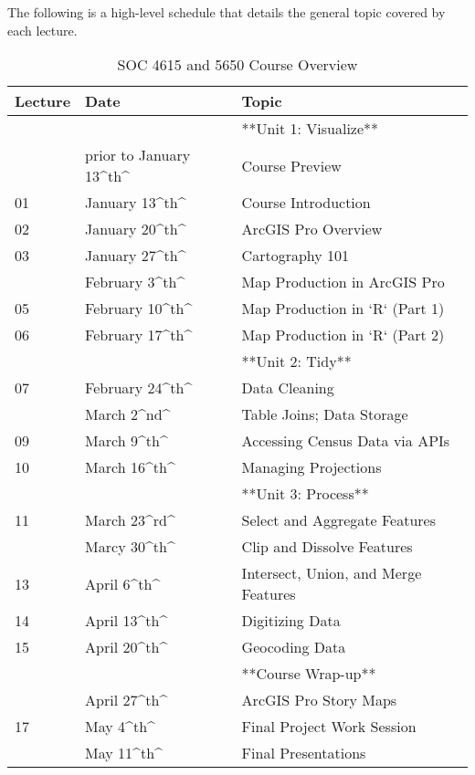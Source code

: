 \documentclass[
]{book}
\begin{document}
The following is a high-level schedule that details the general topic covered by each lecture.

\begin{table}

\caption{\label{tab:unnamed-chunk-1}SOC 4615 and 5650 Course Overview}
\centering
\begin{tabular}[t]{lll}
\toprule
Lecture & Date & Topic\\
\midrule
 &  & **Unit 1: Visualize**\\
 & prior to January 13\textasciicircum{}th\textasciicircum{} & Course Preview\\
01 & January 13\textasciicircum{}th\textasciicircum{} & Course Introduction\\
02 & January 20\textasciicircum{}th\textasciicircum{} & ArcGIS Pro Overview\\
03 & January 27\textasciicircum{}th\textasciicircum{} & Cartography 101\\
\addlinespace
04 & February 3\textasciicircum{}th\textasciicircum{} & Map Production in ArcGIS Pro\\
05 & February 10\textasciicircum{}th\textasciicircum{} & Map Production in `R` (Part 1)\\
06 & February 17\textasciicircum{}th\textasciicircum{} & Map Production in `R` (Part 2)\\
 &  & **Unit 2: Tidy**\\
07 & February 24\textasciicircum{}th\textasciicircum{} & Data Cleaning\\
\addlinespace
08 & March 2\textasciicircum{}nd\textasciicircum{} & Table Joins; Data Storage\\
09 & March 9\textasciicircum{}th\textasciicircum{} & Accessing Census Data via APIs\\
10 & March 16\textasciicircum{}th\textasciicircum{} & Managing Projections\\
 &  & **Unit 3: Process**\\
11 & March 23\textasciicircum{}rd\textasciicircum{} & Select and Aggregate Features\\
\addlinespace
12 & Marcy 30\textasciicircum{}th\textasciicircum{} & Clip and Dissolve Features\\
13 & April 6\textasciicircum{}th\textasciicircum{} & Intersect, Union, and Merge Features\\
14 & April 13\textasciicircum{}th\textasciicircum{} & Digitizing Data\\
15 & April 20\textasciicircum{}th\textasciicircum{} & Geocoding Data\\
 &  & **Course Wrap-up**\\
\addlinespace
16 & April 27\textasciicircum{}th\textasciicircum{} & ArcGIS Pro Story Maps\\
17 & May 4\textasciicircum{}th\textasciicircum{} & Final Project Work Session\\
 & May 11\textasciicircum{}th\textasciicircum{} & Final Presentations\\
\bottomrule
\end{tabular}
\end{table}
\end{document}
